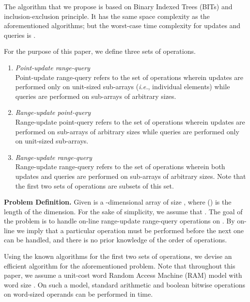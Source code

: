 \documentclass[a4paper]{article}
\begin{document}
\vspace{2 mm}
The algorithm that we propose is based on Binary Indexed Trees\cite{BIT} (BITs) and inclusion-exclusion principle. It has the same space complexity as the aforementioned algorithms; but the worst-case time complexity for updates and queries is .

\vspace{2 mm}
\noindent
For the purpose of this paper, we define three sets of operations.

\begin{enumerate}
\item \textit{Point-update range-query}\\
Point-update range-query refers to the set of operations wherein updates are performed only on unit-sized sub-arrays (\textit{i.e.}, individual elements) while queries are performed on sub-arrays of arbitrary sizes.
\item \textit{Range-update point-query}\\
Range-update point-query refers to the set of operations wherein updates are performed on sub-arrays of arbitrary sizes while queries are performed only on unit-sized sub-arrays.
\item \textit{Range-update range-query}\\
Range-update range-query refers to the set of operations wherein both updates and queries are performed on sub-arrays of arbitrary sizes. Note that the first two sets of operations are subsets of this set.
\end{enumerate}

\noindent
\textbf{Problem Definition.} Given is a -dimensional array  of size , where  () is the length of the  dimension. For the sake of simplicity, we assume that . The goal of the problem is to handle on-line range-update range-query operations on . By on-line we imply that a particular operation must be performed before the next one can be handled, and there is no prior knowledge of the order of operations.

\vspace{2 mm}
Using the known algorithms for the first two sets of operations, we devise an efficient algorithm for the aforementioned problem. Note that throughout this paper, we assume a unit-cost word Random Access Machine (RAM) model with word size . On such a model, standard arithmetic and boolean bitwise operations on word-sized operands can be performed in  time.
\end{document}
